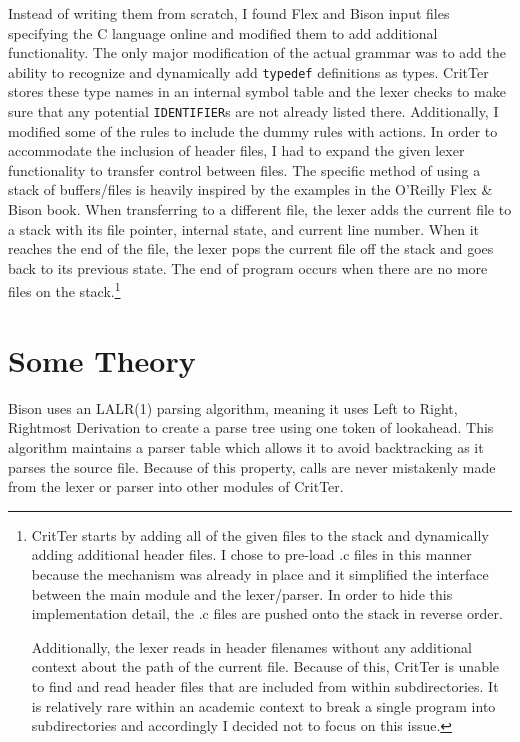 \documentclass[12pt]{report}
\newcommand{\programName}{CritTer\xspace}
\begin{document}
Instead of writing them from scratch, I found Flex and Bison input files specifying the C language
online\cite{originalGrammar} and modified them to add additional functionality. The only major 
modification of the actual grammar was to add the ability to recognize and dynamically add 
\lstinline{typedef} definitions as types. \programName stores these type names in an internal symbol 
table and the lexer checks to make sure that any potential \lstinline{IDENTIFIER}s are not already listed 
there. Additionally, I modified some of the rules to include the dummy rules with actions. In 
order to accommodate the inclusion of header files, I had to expand the given lexer functionality to 
transfer control between files. The specific method of using a stack of buffers\slash files is heavily 
inspired by the examples in the O'Reilly Flex \& Bison book\cite{flex-and-bison}. When transferring to a 
different file, the lexer adds the current file to a stack with its file pointer, internal state, and current line 
number. When it reaches the end of the file, the lexer pops the current file off the stack and goes back 
to its previous state. The end of program occurs when there are no more files on the 
stack.\footnote{\programName starts by adding all of the given files to the stack and dynamically adding 
additional header files. I chose to pre-load .c files in this manner because the mechanism was already in 
place and it simplified the interface between the main module and the lexer\slash parser. In order to hide 
this implementation detail, the .c files are pushed onto the stack in reverse order.

Additionally, the lexer reads in header filenames without any additional context about the path of the 
current file. Because of this, \programName is unable to find and read header files that are included from 
within subdirectories. It is relatively rare within an academic context to break a single program into 
subdirectories and accordingly I decided not to focus on this issue.} 

\section{Some Theory}
Bison uses an LALR(1) parsing algorithm, meaning it uses Left to Right, Rightmost Derivation to create a 
parse tree using one token of lookahead. This algorithm maintains a parser table which allows it to avoid 
backtracking as it parses the source file. Because of this property, calls are never mistakenly made from 
the lexer or parser into other modules of \programName.
\end{document}
